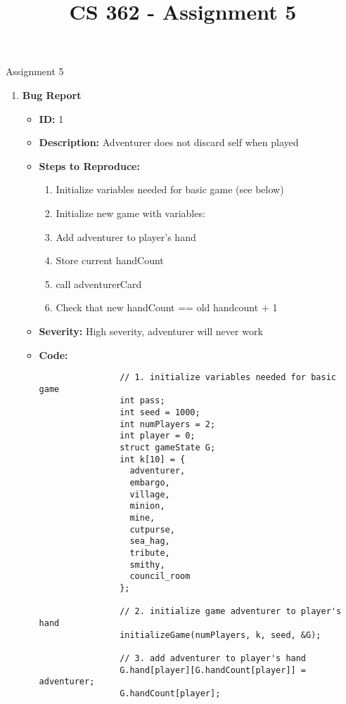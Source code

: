 \documentclass[11pt,letterpaper]{article}
\begin{document}
 \univlogo

\title{CS 362 - Assignment 5}
{\Huge Assignment 5}\\[5mm]
\begin{enumerate}[label=\Roman*.]
  \item \textbf{Bug Report}
      \begin{itemize}
        \item \textbf{ID:} 1
        \item \textbf{Description:} Adventurer does not discard self when played
        \item \textbf{Steps to Reproduce:} 
          \begin{enumerate}
            \item Initialize variables needed for basic game (see below)
            \item Initialize new game with variables:
            \item Add adventurer to player's hand
            \item Store current handCount
            \item call adventurerCard
            \item Check that new handCount == old handcount + 1
          \end{enumerate}
        \item \textbf{Severity:} High severity, adventurer will never work
        \item \textbf{Code:} 

              \begin{lstlisting}
                // 1. initialize variables needed for basic game
                int pass;                             
                int seed = 1000;                      
                int numPlayers = 2;                   
                int player = 0;                       
                struct gameState G;
                int k[10] = {
                  adventurer, 
                  embargo, 
                  village, 
                  minion, 
                  mine, 
                  cutpurse, 
                  sea_hag, 
                  tribute, 
                  smithy, 
                  council_room
                }; 

                // 2. initialize game adventurer to player's hand
                initializeGame(numPlayers, k, seed, &G);

                // 3. add adventurer to player's hand
                G.hand[player][G.handCount[player]] = adventurer;
                G.handCount[player];


\end{lstlisting}
\end{itemize}
\end{enumerate}
\end{document}
